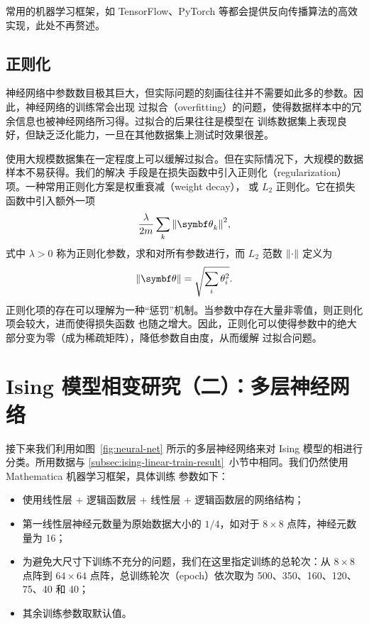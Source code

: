 常用的机器学习框架，如 TensorFlow、PyTorch 等都会提供反向传播算法的高效实现，此处不再赘述。

\subsection{正则化}
\label{subsec:regularization}

神经网络中参数数目极其巨大，但实际问题的刻画往往并不需要如此多的参数。因此，神经网络的训练常会出现
过拟合（overfitting）的问题，使得数据样本中的冗余信息也被神经网络所习得。过拟合的后果往往是模型在
训练数据集上表现良好，但缺乏泛化能力，一旦在其他数据集上测试时效果很差。

使用大规模数据集在一定程度上可以缓解过拟合。但在实际情况下，大规模的数据样本不易获得。我们的解决
手段是在损失函数中引入正则化（regularization）项。一种常用正则化方案是权重衰减（weight decay），
或 $L_2$ 正则化。它在损失函数中引入额外一项
\begin{equation}
  \frac{\lambda}{2m} \sum_k \norm{\bm{\theta}_k}^2,
\end{equation}
式中 $\lambda>0$ 称为正则化参数，求和对所有参数进行，而 $L_2$ 范数 $\norm{\cdot}$ 定义为
\begin{equation}
  \norm{\bm{\theta}} = \sqrt{\sum_i \theta_i^2}.
\end{equation}
正则化项的存在可以理解为一种“惩罚”机制。当参数中存在大量非零值，则正则化项会较大，进而使得损失函数
也随之增大。因此，正则化可以使得参数中的绝大部分变为零（成为稀疏矩阵），降低参数自由度，从而缓解
过拟合问题。

\section{Ising 模型相变研究（二）：多层神经网络}

接下来我们利用如图~\ref{fig:neural-net} 所示的多层神经网络来对 Ising 模型的相进行分类。所用数据与
\ref{subsec:ising-linear-train-result}~小节中相同。我们仍然使用 Mathematica 机器学习框架，具体训练
参数如下：

\begin{itemize}
  \item 使用线性层 + 逻辑函数层 + 线性层 + 逻辑函数层的网络结构；
  \item 第一线性层神经元数量为原始数据大小的 $1/4$，如对于 $8 \times 8$ 点阵，神经元数量为 16；
  \item 为避免大尺寸下训练不充分的问题，我们在这里指定训练的总轮次：从 $8 \times 8$ 点阵到
    $64 \times 64$ 点阵，总训练轮次（epoch）依次取为 500、350、160、120、75、40 和 40；
  \item 其余训练参数取默认值。
\end{itemize}

